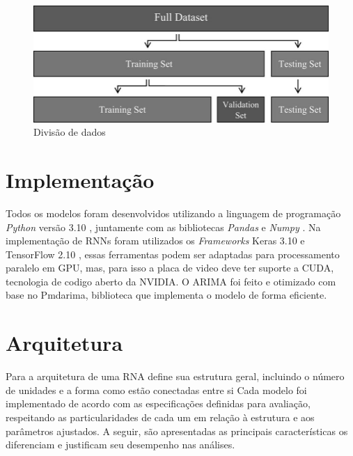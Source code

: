 \begin{figure}[!htb] \centering
    \caption{Divisão de dados} \label{figura:train_test}
    \begin{varwidth}{\linewidth}
      \includegraphics[width=12cm]{figuras/train_test.png}
    \end{varwidth}
\end{figure}

\section{Implementação} \label{sec:implementacao}
Todos os modelos foram desenvolvidos utilizando a linguagem de programação \textit{Python} versão 3.10 \cite{ramalho}, juntamente com as bibliotecas \textit{Pandas} e \textit{Numpy} \cite{Data}. 
Na implementação de RNNs foram utilizados os \textit{Frameworks} Keras 3.10 e TensorFlow 2.10 \cite{maosaobra}, essas ferramentas podem ser adaptadas para processamento paralelo em GPU, mas, para isso a placa de video deve ter suporte a CUDA, tecnologia de codigo aberto da NVIDIA.
O ARIMA foi feito e otimizado com base no Pmdarima, biblioteca que implementa o modelo de forma eficiente.

\section{Arquitetura} \label{sec:arquitetura}
Para \textcite{Good} a arquitetura de uma RNA define sua estrutura geral, incluindo o número de unidades e a forma como estão conectadas entre si
Cada modelo foi implementado de acordo com as especificações definidas para avaliação, respeitando as particularidades de cada um em relação à estrutura e aos parâmetros ajustados.
A seguir, são apresentadas as principais características os diferenciam e justificam seu desempenho nas análises.

